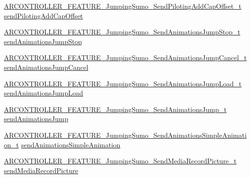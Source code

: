 \begin{DoxyCompactItemize}
\item 
\hyperlink{_a_r_c_o_n_t_r_o_l_l_e_r___feature_8h_a3c9ceb6c0223c7220c4ce210ea217b7c}{A\+R\+C\+O\+N\+T\+R\+O\+L\+L\+E\+R\+\_\+\+F\+E\+A\+T\+U\+R\+E\+\_\+\+Jumping\+Sumo\+\_\+\+Send\+Piloting\+Add\+Cap\+Offset\+\_\+t} \hyperlink{struct_a_r_c_o_n_t_r_o_l_l_e_r___f_e_a_t_u_r_e___jumping_sumo__t_adbab6736b9b527e2d80835773355cf79}{send\+Piloting\+Add\+Cap\+Offset}
\item 
\hyperlink{_a_r_c_o_n_t_r_o_l_l_e_r___feature_8h_a8104bcf2fab25fb6a066d447f6fcbf80}{A\+R\+C\+O\+N\+T\+R\+O\+L\+L\+E\+R\+\_\+\+F\+E\+A\+T\+U\+R\+E\+\_\+\+Jumping\+Sumo\+\_\+\+Send\+Animations\+Jump\+Stop\+\_\+t} \hyperlink{struct_a_r_c_o_n_t_r_o_l_l_e_r___f_e_a_t_u_r_e___jumping_sumo__t_ada787c57b0cd808d0c9575a454979483}{send\+Animations\+Jump\+Stop}
\item 
\hyperlink{_a_r_c_o_n_t_r_o_l_l_e_r___feature_8h_af14ccfb5adaabcda5f6fa44c15be6129}{A\+R\+C\+O\+N\+T\+R\+O\+L\+L\+E\+R\+\_\+\+F\+E\+A\+T\+U\+R\+E\+\_\+\+Jumping\+Sumo\+\_\+\+Send\+Animations\+Jump\+Cancel\+\_\+t} \hyperlink{struct_a_r_c_o_n_t_r_o_l_l_e_r___f_e_a_t_u_r_e___jumping_sumo__t_a45516e39b79f408d9cebce78f9c13b99}{send\+Animations\+Jump\+Cancel}
\item 
\hyperlink{_a_r_c_o_n_t_r_o_l_l_e_r___feature_8h_abb0c46f89ba18b4a2648cc7c3a666b72}{A\+R\+C\+O\+N\+T\+R\+O\+L\+L\+E\+R\+\_\+\+F\+E\+A\+T\+U\+R\+E\+\_\+\+Jumping\+Sumo\+\_\+\+Send\+Animations\+Jump\+Load\+\_\+t} \hyperlink{struct_a_r_c_o_n_t_r_o_l_l_e_r___f_e_a_t_u_r_e___jumping_sumo__t_a212e71acf1d3593b57e0130774f0e1c0}{send\+Animations\+Jump\+Load}
\item 
\hyperlink{_a_r_c_o_n_t_r_o_l_l_e_r___feature_8h_a87c63d4e42355ab2e9e113f652ef2b5b}{A\+R\+C\+O\+N\+T\+R\+O\+L\+L\+E\+R\+\_\+\+F\+E\+A\+T\+U\+R\+E\+\_\+\+Jumping\+Sumo\+\_\+\+Send\+Animations\+Jump\+\_\+t} \hyperlink{struct_a_r_c_o_n_t_r_o_l_l_e_r___f_e_a_t_u_r_e___jumping_sumo__t_a9387f1f8ac00db88fa255a4e9fc1d954}{send\+Animations\+Jump}
\item 
\hyperlink{_a_r_c_o_n_t_r_o_l_l_e_r___feature_8h_aa39e9bb05c6b9119de37892ddaad17c9}{A\+R\+C\+O\+N\+T\+R\+O\+L\+L\+E\+R\+\_\+\+F\+E\+A\+T\+U\+R\+E\+\_\+\+Jumping\+Sumo\+\_\+\+Send\+Animations\+Simple\+Animation\+\_\+t} \hyperlink{struct_a_r_c_o_n_t_r_o_l_l_e_r___f_e_a_t_u_r_e___jumping_sumo__t_af3f99c6a9d29871f85a6b54d12f389e4}{send\+Animations\+Simple\+Animation}
\item 
\hyperlink{_a_r_c_o_n_t_r_o_l_l_e_r___feature_8h_aa8f1dd6d82183276750c598e17855d3c}{A\+R\+C\+O\+N\+T\+R\+O\+L\+L\+E\+R\+\_\+\+F\+E\+A\+T\+U\+R\+E\+\_\+\+Jumping\+Sumo\+\_\+\+Send\+Media\+Record\+Picture\+\_\+t} \hyperlink{struct_a_r_c_o_n_t_r_o_l_l_e_r___f_e_a_t_u_r_e___jumping_sumo__t_ab226a3bef507d91b48130dd9529c0143}{send\+Media\+Record\+Picture}

\end{DoxyCompactItemize}
